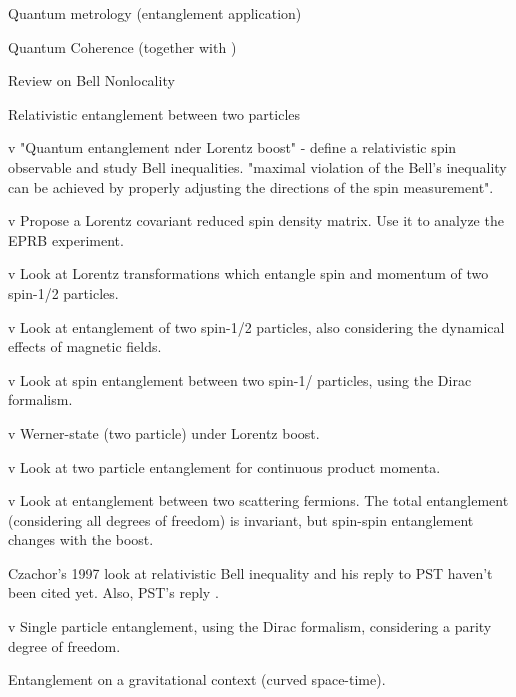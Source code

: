\documentclass[11pt,a4paper,notitlepage]{article}
\begin{document}
\cite{toth_2014} Quantum metrology (entanglement application)

\cite{marvian_2016} Quantum Coherence (together with \cite{baumgratz_2014})

\cite{brunner_2014} Review on Bell Nonlocality

\cite{li_du_2003} Relativistic entanglement between two particles

\cite{lee_young_2004} v "Quantum entanglement nder Lorentz boost" - define a relativistic spin observable and study Bell inequalities. "maximal violation of the Bell's inequality can be achieved by properly adjusting the directions of the spin measurement".

\cite{caban_2005} v Propose a Lorentz covariant reduced spin density matrix. Use it to analyze the EPRB experiment.

\cite{jordan_2007} v Look at Lorentz transformations which entangle spin and momentum of two spin-1/2 particles.

\cite{chakrabarti_2009} v Look at entanglement of two spin-1/2 particles, also considering the dynamical effects of magnetic fields.

\cite{choi_2011} v Look at spin entanglement between two spin-1/ particles, using the Dirac formalism.

\cite{palge_dunningham_2015} v Werner-state (two particle) under Lorentz boost.

\cite{palge_2018} v Look at two particle entanglement for continuous product momenta.

\cite{fan_li_2018} v Look at entanglement between two scattering fermions. The total entanglement (considering all degrees of freedom) is invariant, but spin-spin entanglement changes with the boost.

\cite{czachor_1997} Czachor's 1997 look at relativistic Bell inequality and his reply to PST \cite{czachor_2005} haven't been cited yet. Also, PST's reply \cite{peres_2005}.

\cite{bittencourt_2020} \cite{bernardini_bittencourt_2020} v Single particle entanglement, using the Dirac formalism, considering a parity degree of freedom.

\cite{friis_2012} \cite{alsing_2012} Entanglement on a gravitational context (curved space-time).




 

\end{document}
